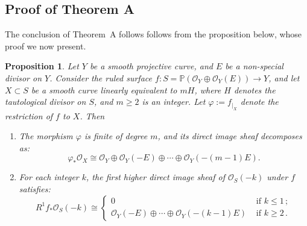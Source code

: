 \documentclass[a4paper,12pt]{amsart}
\newtheorem{prop}[thm]{Proposition}
\begin{document}
\subsection{Proof of Theorem A}\label{Sec2.2}

The conclusion of \textnormal{Theorem~A} follows follows from the proposition below, whose proof we now present.

\begin{prop}\label{ThmA_Prop}
Let $Y$ be a smooth projective curve, and $E$ be a non-special divisor on $Y$. Consider the ruled surface $f : S = \mathbb{P} (\mathcal{O}_Y \oplus \mathcal{O}_Y (E)) \to Y$, and let $X \subset S$ be a smooth curve linearly equivalent to $mH$, where $H$ denotes the tautological divisor on $S$, and $m \geq 2$ is an integer. Let $\varphi := f_{|_X}$ denote the restriction of $f$ to $X$. Then
\begin{enumerate}[label=(\roman*), leftmargin=*, font=\rmfamily]
 \item The morphism $\varphi$ is finite of degree $m$, and its direct image sheaf decomposes as:
 \begin{equation}\label{ThmA_Prop_Decomp}
  \varphi_{\ast} \mathcal{O}_X \cong \mathcal{O}_Y \oplus \mathcal{O}_Y (-E)  \oplus \cdots \oplus \mathcal{O}_Y (-(m-1)E) .
 \end{equation}

 \item For each integer $k$, the first higher direct image sheaf of $\mathcal{O}_S (-k)$ under $f$ satisfies:
 \begin{equation}\label{ThmA_Prop_Decomp_Coro}
 R^1 f_{\ast} \mathcal{O}_S (-k) \cong
 \begin{cases}
  0   & \mbox{ if } k \leq 1 \, ; \\
  \mathcal{O}_Y (-E) \oplus \cdots \oplus \mathcal{O}_Y (-(k-1)E)  & \mbox{ if } k \geq 2 \, .
 \end{cases}
\end{equation}
\end{enumerate}
\end{prop}
\end{document}

